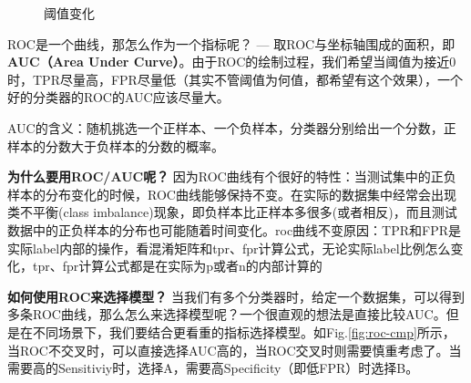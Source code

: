 \begin{figure}[h]
	\centering
	\quad
	\caption{阈值变化}
	\label{fig:threshold-change}
\end{figure}
ROC是一个曲线，那怎么作为一个指标呢？ --- 取ROC与坐标轴围成的面积，即\textbf{AUC（Area Under Curve）}。由于ROC的绘制过程，我们希望当阈值为接近0时，TPR尽量高，FPR尽量低（其实不管阈值为何值，都希望有这个效果），一个好的分类器的ROC的AUC应该尽量大。

AUC的含义：随机挑选一个正样本、一个负样本，分类器分别给出一个分数，正样本的分数大于负样本的分数的概率。

\textbf{为什么要用ROC/AUC呢？}\newline
因为ROC曲线有个很好的特性：当测试集中的正负样本的分布变化的时候，ROC曲线能够保持不变。在实际的数据集中经常会出现类不平衡(class imbalance)现象，即负样本比正样本多很多(或者相反)，而且测试数据中的正负样本的分布也可能随着时间变化。roc曲线不变原因：TPR和FPR是实际label内部的操作，看混淆矩阵和tpr、fpr计算公式，无论实际label比例怎么变化，tpr、fpr计算公式都是在实际为p或者n的内部计算的

\textbf{如何使用ROC来选择模型？}\newline
当我们有多个分类器时，给定一个数据集，可以得到多条ROC曲线，那么怎么来选择模型呢？一个很直观的想法是直接比较AUC。但是在不同场景下，我们要结合更看重的指标选择模型。如Fig.\ref{fig:roc-cmp}所示，当ROC不交叉时，可以直接选择AUC高的，当ROC交叉时则需要慎重考虑了。当需要高的Sensitiviy时，选择A，需要高Specificity（即低FPR）时选择B。


